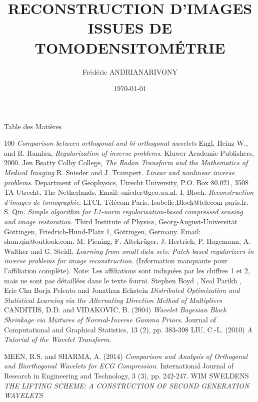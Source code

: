 \documentclass[10pt,aspectration=169]{beamer}
\title[CT-Images]{RECONSTRUCTION D'IMAGES ISSUES DE TOMODENSITOMÉTRIE}
\author[Frédéric]{Frédéric ANDRIANARIVONY}
\institute[ESPA Vontovorona]{Département Éléctronique}
\date{\today}
\begin{document}
	
    \begin{frame}
        \titlepage
    \end{frame}

    \begin{frame}{Table des Matières}
        \tableofcontents
    \end{frame}







	
    \begin{thebibliography}{100}
         \emph{Comparison between orthogonal and bi-orthogonal wavelets}
          Engl, Heinz W., and R. Ramlau, \emph{Regularization of inverse problems}. Kluwer Academic Publishers, 2000.
         Jen Beatty Colby College, \emph{The Radon Transform and the Mathematics of Medical Imaging}
         R. Snieder and J. Trampert. \emph{Linear and nonlinear inverse problems}. Department of Geophysics, Utrecht University, P.O. Box 80.021, 3508 TA Utrecht, The Netherlands. Email: snieder@geo.uu.nl.
         I. Bloch. \emph{Reconstruction d’images de tomographie}. LTCI, Télécom Paris, Isabelle.Bloch@telecom-paris.fr.
         S. Qin. \emph{Simple algorithm for L1-norm regularisation-based compressed sensing and image restoration}. Third Institute of Physics, Georg-August-Universität Göttingen, Friedrich-Hund-Platz 1, Göttingen, Germany. Email: shun.qin@outlook.com.
         M. Piening, F. Altekrüger, J. Hertrich, P. Hagemann, A. Walther and G. Steidl. \emph{Learning from small data sets: Patch-based regularizers in inverse problems for image reconstruction}. (Information manquante pour l’affiliation complète). Note: Les affiliations sont indiquées par les chiffres 1 et 2, mais ne sont pas détaillées dans le texte fourni.
         Stephen Boyd , Neal Parikh , Eric Chu Borja Peleato and Jonathan Eckstein \emph{Distributed Optimization and Statistical Learning via the Alternating Direction Method of Multipliers}
        CANDITIIS, D.D. and VIDAKOVIC, B. (2004) \emph { Wavelet Bayesian Block Shrinkage via Mixtures of Normal-Inverse Gamma Priors}. Journal of Computational and Graphical Statistics, 13 (2), pp. 383-398
         LIU, C.-L. (2010) \emph{A Tutorial of the Wavelet Transform}.
        
        MEEN, R.S. and SHARMA, A. (2014) \emph{Comparison and Analysis of Orthogonal and Biorthogonal Wavelets for ECG Compression}. International Journal of Research in Engineering and Technology, 3 (3), pp. 242-247.
         WIM SWELDENS \emph{THE LIFTING SCHEME: A CONSTRUCTION OF SECOND GENERATION WAVELETS}


\end{thebibliography}
\end{document}
